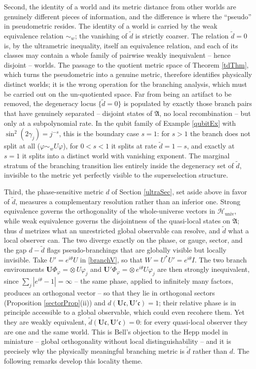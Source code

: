 \documentclass[twoside,11pt,letter]{article}
\def\cH{{\mathcal{H}}}
\def\fc{{\mathfrak{c}}}
\theoremstyle{definition}
\theoremstyle{definition}
\theoremstyle{plain}
\begin{document}
Second, the identity of a world and its metric distance from other worlds are genuinely different pieces of information, and the difference is where the ``pseudo'' in pseudometric resides. The identity of a world is carried by the weak equivalence relation $\sim_w$; the vanishing of $\tilde d$ is strictly coarser. The relation $\tilde d=0$ is, by the ultrametric inequality, itself an equivalence relation, and each of its classes may contain a whole family of pairwise weakly inequivalent -- hence disjoint -- worlds. The passage to the quotient metric space of Theorem \ref{tdThm}, which turns the pseudometric into a genuine metric, therefore identifies physically distinct worlds; it is the wrong operation for the branching analysis, which must be carried out on the un-quotiented space. Far from being an artifact to be removed, the degeneracy locus $\{\tilde d=0\}$ is populated by exactly those branch pairs that have genuinely separated -- disjoint states of $\mathfrak{A}$, no local recombination -- but only at a subpolynomial rate. In the qubit family of Example \ref{qubitEx} with $\sin^2(2\gamma_j)=j^{-s}$, this is the boundary case $s=1$: for $s>1$ the branch does not split at all ($\varphi\sim_w U\varphi$), for $0<s<1$ it splits at rate $\tilde d=1-s$, and exactly at $s=1$ it splits into a distinct world with vanishing exponent. The marginal stratum of the branching transition lies entirely inside the degeneracy set of $\tilde d$, invisible to the metric yet perfectly visible to the superselection structure.

Third, the phase-sensitive metric $d$ of Section \ref{ultraSec}, set aside above in favor of $\tilde d$, measures a complementary resolution rather than an inferior one. Strong equivalence governs the orthogonality of the whole-universe vectors in $\cH_{\mathrm{univ}}$, while weak equivalence governs the disjointness of the quasi-local states on $\mathfrak{A}$; thus $d$ metrizes what an unrestricted global observable can resolve, and $\tilde d$ what a local observer can. The two diverge exactly on the phase, or gauge, sector, and the gap $d-\tilde d$ flags pseudo-branchings that are globally visible but locally invisible. Take $U'=e^{i\theta}U$ in \eqref{branchV}, so that $W=U^\ast U'=e^{i\theta}I$. The two branch environments $\mathbf{U}\Phi_\varphi=\otimes\,U\varphi_j$ and $\mathbf{U}'\Phi_\varphi=\otimes\,e^{i\theta}U\varphi_j$ are then strongly inequivalent, since $\sum_j|e^{i\theta}-1|=\infty$ -- the same phase, applied to infinitely many factors, produces an orthogonal vector -- so that they lie in orthogonal sectors (Proposition \ref{sectorProp}(ii)) and $d(\mathbf{U}\fc,\mathbf{U}'\fc)=1$; their relative phase is in principle accessible to a global observable, which could even recohere them. Yet they are weakly equivalent, $\tilde d(\mathbf{U}\fc,\mathbf{U}'\fc)=0$: for every quasi-local observer they are one and the same world. This is Bell's objection to the Hepp model \cite{B75} in miniature -- global orthogonality without local distinguishability -- and it is precisely why the physically meaningful branching metric is $\tilde d$ rather than $d$. The following remarks develop this locality theme.
\end{document}
